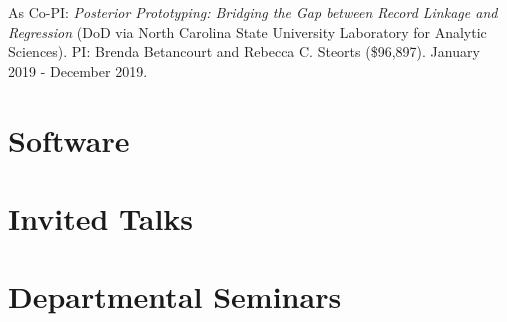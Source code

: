 \documentclass[margin,line]{res}
\begin{document}
\begin{resume}
As Co-PI: {\em Posterior Prototyping: Bridging the Gap between Record Linkage and Regression} (DoD via North Carolina State University Laboratory for Analytic Sciences). PI: Brenda Betancourt and Rebecca C. Steorts (\$96,897). January 2019 - December 2019.

% 
% 
% 
% 
% 
% 

\section{\sc Software}
\printbibliography[keyword=packages, heading=none, resetnumbers=true]

\section{\sc Invited Talks}
\printbibliography[keyword=talk-invited, heading=none, resetnumbers=true]

\section{\sc Departmental Seminars}
\printbibliography[keyword=seminar, heading=none, resetnumbers=true]


\end{resume}
\end{document}
